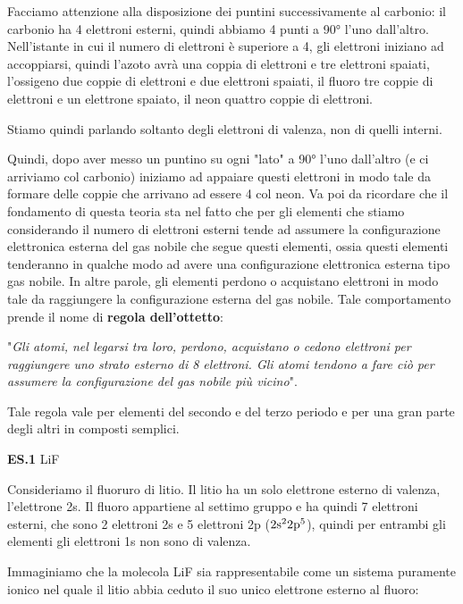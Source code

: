 \vspace{0.2cm}Facciamo attenzione alla disposizione dei puntini successivamente al carbonio: il carbonio ha 4 elettroni esterni, quindi abbiamo 4 punti a 90° l'uno dall'altro. Nell'istante in cui il numero di elettroni è superiore a 4, gli elettroni iniziano ad accoppiarsi, quindi l'azoto avrà una coppia di elettroni e tre elettroni spaiati, l'ossigeno due coppie di elettroni e due elettroni spaiati, il fluoro tre coppie di elettroni e un elettrone spaiato, il neon quattro coppie di elettroni.

Stiamo quindi parlando soltanto degli elettroni di valenza, non di quelli interni.

Quindi, dopo aver messo un puntino su ogni "lato" a 90° l'uno dall'altro (e ci arriviamo col carbonio) iniziamo ad appaiare questi elettroni in modo tale da formare delle coppie che arrivano ad essere 4 col neon. Va poi da ricordare che il fondamento di questa teoria sta nel fatto che per gli elementi che stiamo considerando il numero di elettroni esterni tende ad assumere la configurazione elettronica esterna del gas nobile che segue questi elementi, ossia questi elementi tenderanno in qualche modo ad avere una configurazione elettronica esterna tipo gas nobile. In altre parole, gli elementi perdono o acquistano elettroni in modo tale da raggiungere la configurazione esterna del gas nobile. Tale comportamento prende il nome di \textbf{regola dell'ottetto}:

\vspace{0.2cm}"\textit{Gli atomi, nel legarsi tra loro, perdono, acquistano o cedono elettroni per raggiungere uno strato esterno di 8 elettroni. Gli atomi tendono a fare ciò per assumere la configurazione del gas nobile più vicino}". 

\vspace{0.2cm}Tale regola vale per elementi del secondo e del terzo periodo e per una gran parte degli altri in composti semplici.

\vspace{0.2cm}\textbf{ES.1} LiF

Consideriamo il fluoruro di litio. Il litio ha un solo elettrone esterno di valenza, l'elettrone 2s. Il fluoro appartiene al settimo gruppo e ha quindi 7 elettroni esterni, che sono 2 elettroni 2s e 5 elettroni 2p ($\rm 2s^22p^5$), quindi per entrambi gli elementi gli elettroni 1s non sono di valenza.

Immaginiamo che la molecola LiF sia rappresentabile come un sistema puramente ionico nel quale il litio abbia ceduto il suo unico elettrone esterno al fluoro:

